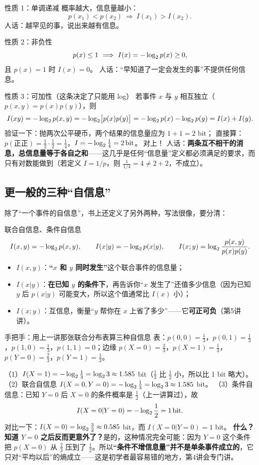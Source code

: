 \begin{defbox}{性质 1：单调递减}
概率越大，信息量越小：
\[
p(x_1)<p(x_2)\ \Longrightarrow\ I(x_1)>I(x_2).
\]
人话：越罕见的事，说出来越有信息。
\end{defbox}

\begin{defbox}{性质 2：非负性}
\[
p(x)\le 1\ \Longrightarrow\ I(x)=-\lb p(x)\ge 0,
\]
且 $p(x)=1$ 时 $I(x)=0$。
人话：“早知道了一定会发生的事”不提供任何信息。
\end{defbox}

\begin{defbox}{性质 3：可加性（这条决定了只能用 log）}
若事件 $x$ 与 $y$ 相互独立（$p(x,y)=p(x)p(y)$），则
\[
I(xy)=-\log_{2} p(x,y)=-\log_{2}\bigl[p(x)p(y)\bigr]=-\log_{2} p(x)-\log_{2} p(y)=I(x)+I(y).
\]
验证一下：抛两次公平硬币，两个结果的信息量应为 $1+1=2$ bit；
直接算：$p(\text{正正})=\frac12\cdot\frac12=\frac14$，$I=-\log_{2}\frac14=2\,\text{bit}$。$\ $对上！
人话：\textbf{两条互不相干的消息，总信息量等于各自之和}——这几乎是任何“信息量”定义都必须满足的要求，而只有对数能做到（若定义 $I=1/p$，则 $\frac{1}{1/4}=4\ne2+2$，不成立）。
\end{defbox}

\subsection{更一般的三种“自信息”}

除了“一个事件的自信息”，书上还定义了另外两种，写法很像，要分清：

\begin{defbox}{联合自信息、条件自信息}
\[
I(x,y)=-\log_{2} p(x,y),\qquad
I(x|y)=-\log_{2} p(x|y),\qquad
I(x;y)=\log_{2}\frac{p(x,y)}{p(x)p(y)} .
\]
\begin{itemize}[leftmargin=1.6em,itemsep=1pt,topsep=1pt]
  \item $I(x,y)$：\textbf{“$x$ 和 $y$ 同时发生”}这个联合事件的信息量；
  \item $I(x|y)$：\textbf{在已知 $y$ 的条件下}，再告诉你“$x$ 发生了”还值多少信息（因为已知 $y$ 后 $p(x|y)$ 可能变大，所以这个值通常比 $I(x)$ 小）；
  \item $I(x;y)$：互信息，衡量“$y$ 帮你在 $x$ 上省了多少”——它\textbf{可正可负}（第5讲讲）。
\end{itemize}
\end{defbox}

\begin{calc}{手把手：用上一讲那张联合分布表算三种自信息}
表：$p(0,0)=\frac13$，$p(0,1)=\frac13$，$p(1,0)=\frac13$，$p(1,1)=0$；边缘 $p(X=0)=\frac23$，$p(X=1)=\frac13$，$p(Y=0)=\frac23$，$p(Y=1)=\frac13$。

（1）$I(X=1)=-\log_{2}\frac13=\log_{2}3\approx1.585$ bit（$\frac13$ 比 $\frac12$ 小，所以比 1 bit 略大）。
（2）联合自信息 $I(X=0,Y=0)=-\log_{2}\frac13=\log_{2}3\approx1.585$ bit。
（3）条件自信息：已知 $Y=0$ 后 $X=0$ 的条件概率是 $\frac12$（上一讲算过），故
\[
I(X=0|Y=0)=-\log_{2}\frac12=1\,\text{bit} .
\]
对比一下：$I(X=0)=\log_{2}\frac32\approx0.585$ bit，而 $I(X=0|Y=0)=1$ bit。
\textbf{什么？知道 $Y=0$ 之后反而更意外了？}是的，这种情况完全可能：因为 $Y=0$ 这个条件把 $p(X=0)$ 从 $\frac23$ 压到了 $\frac12$。所以\textbf{“条件不增信息量”并不是单条事件成立的}，它只对“平均以后”的熵成立——这是初学者最容易错的地方，第4讲会专门讲。
\end{calc}

